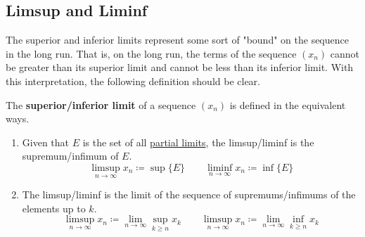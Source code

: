 \subsection{Limsup and Liminf} 

  The superior and inferior limits represent some sort of "bound" on the sequence in the long run. That is, on the long run, the terms of the sequence $(x_n)$ cannot be greater than its superior limit and cannot be less than its inferior limit. With this interpretation, the following definition should be clear. 

  \begin{definition}
    \label{def:inferior-superior-limits}
    The \textbf{superior/inferior limit} of a sequence $(x_n)$ is defined in the equivalent ways. 
    \begin{enumerate}
      \item Given that $E$ is the set of all \hyperref[pst-def:partial-limits]{partial limits}, the limsup/liminf is the supremum/infimum of $E$. 
      \begin{equation}
        \limsup_{n \rightarrow \infty} x_n \coloneqq \sup\{E\} \qquad \liminf_{n \rightarrow \infty} x_n \coloneqq \inf\{E\}
      \end{equation}
      \item The limsup/liminf is the limit of the sequence of supremums/infimums of the elements up to $k$.  
      \begin{equation}
        \limsup_{n \rightarrow \infty} x_n \coloneqq \lim_{n \rightarrow \infty} \sup_{k \geq n} x_k \qquad \limsup_{n \rightarrow \infty} x_n \coloneqq \lim_{n \rightarrow \infty} \inf_{k \geq n} x_k 
      \end{equation}
    \end{enumerate}

    \begin{figure}[H]
      \centering
      \begin{subfigure}[b]{0.48\textwidth}
        \centering
\end{subfigure}
\end{figure}
\end{definition}
